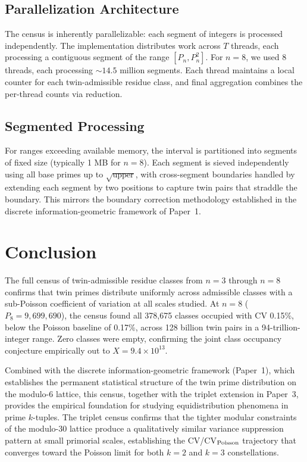 \documentclass[11pt]{article}
\begin{document}
\subsection{Parallelization Architecture}

The census is inherently parallelizable: each segment of integers is processed independently. The implementation distributes work across $T$ threads, each processing a contiguous segment of the range $[P_n, P_n^2]$. For $n=8$, we used 8 threads, each processing $\sim 14.5$ million segments. Each thread maintains a local counter for each twin-admissible residue class, and final aggregation combines the per-thread counts via reduction.

\subsection{Segmented Processing}

For ranges exceeding available memory, the interval is partitioned into segments of fixed size (typically 1 MB for $n=8$). Each segment is sieved independently using all base primes up to $\sqrt{\text{upper}}$, with cross-segment boundaries handled by extending each segment by two positions to capture twin pairs that straddle the boundary. This mirrors the boundary correction methodology established in the discrete information-geometric framework of Paper~1.

\section{Conclusion}
\label{sec:conclusion}

The full census of twin-admissible residue classes from $n=3$ through $n=8$ confirms that twin primes distribute uniformly across admissible classes with a sub-Poisson coefficient of variation at all scales studied. At $n=8$ ($P_8 = 9{,}699{,}690$), the census found all 378{,}675 classes occupied with CV 0.15\%, below the Poisson baseline of 0.17\%, across 128 billion twin pairs in a 94-trillion-integer range. Zero classes were empty, confirming the joint class occupancy conjecture empirically out to $X = 9.4 \times 10^{13}$.

Combined with the discrete information-geometric framework (Paper~1), which establishes the permanent statistical structure of the twin prime distribution on the modulo-6 lattice, this census, together with the triplet extension in Paper~3, provides the empirical foundation for studying equidistribution phenomena in prime $k$-tuples. The triplet census confirms that the tighter modular constraints of the modulo-30 lattice produce a qualitatively similar variance suppression pattern at small primorial scales, establishing the CV/CV$_{\rm Poisson}$ trajectory that converges toward the Poisson limit for both $k=2$ and $k=3$ constellations.
\end{document}
